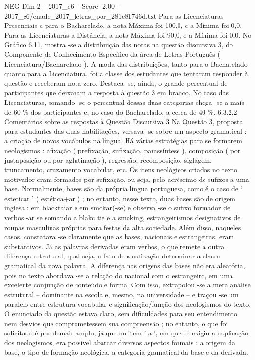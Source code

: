 \begin{textsample}{NEG Dim 2 – 2017\_c6 – Score -2.00 – 2017\_c6/enade\_2017\_letras\_por\_281c81746d.txt}
Para as Licenciaturas Presenciais e para o Bacharelado, a nota Máxima foi 100,0, e a Mínima foi 0,0.
Para as Licenciaturas a Distância, a nota Máxima foi 90,0, e a Mínima foi 0,0.
No Gráfico 6.11, mostra -se a distribuição das notas na questão discursiva 3, do Componente de Conhecimento Específico da área de Letras-Português ( Licenciatura/Bacharelado ).
A moda das distribuições, tanto para o Bacharelado quanto para a Licenciatura, foi a classe dos estudantes que tentaram responder à questão e receberam nota zero.
Destaca -se, ainda, o grande percentual de participantes que deixaram a resposta à questão 3 em branco.
No caso das Licenciaturas, somando -se o percentual dessas duas categorias chega -se a mais de 60 \% dos participantes e, no caso do Bacharelado, a cerca de 40 \%. 6.3.2.2 Comentários sobre as respostas à Questão Discursiva 3 Na Questão 3, proposta para estudantes das duas habilitações, versava -se sobre um aspecto gramatical : a criação de novos vocábulos na língua.
Há várias estratégias para se formarem neologismos : afixação ( prefixação, sufixação, parassíntese ), composição ( por justaposição ou por aglutinação ), regressão, recomposição, siglagem, truncamento, cruzamento vocabular, etc.
Os itens neológicos criados no texto motivador eram formados por sufixação, ou seja, pelo acréscimo de sufixos a uma base.
Normalmente, bases são da própria língua portuguesa, como é o caso de ‘ esteticar ’ ( estética+ar ) ; no entanto, nesse texto, duas bases são de origem inglesa : em blacktaiar e em smokar(-se) e observa -se o sufixo formador de verbos -ar se somando a blakc tie e a smoking, estrangeirismos designativos de roupas masculinas próprias para festas da alta sociedade.
Além disso, naqueles casos, constatava -se claramente que as bases, nacionais e estrangeiras, eram substantivos.
Já as palavras derivadas eram verbos, o que remete a outra diferença estrutural, qual seja, o fato de a sufixação determinar a classe gramatical da nova palavra.
A diferença nas origens das bases não era aleatória, pois no texto abordava -se a relação do nacional com o estrangeiro, em uma excelente conjunção de conteúdo e forma.
Com isso, extrapolou -se a mera análise estrutural – dominante na escola e, mesmo, na universidade – e traçou -se um paralelo entre estrutura vocabular e significação/função dos neologismos do texto.
O enunciado da questão estava claro, sem dificuldades para seu entendimento nem desvios que comprometessem sua compreensão ; no entanto, o que foi solicitado é por demais amplo, já que no item ' a ', em que se exigiu a explicação dos neologismos, era possível abarcar diversos aspectos formais : a origem da base, o tipo de formação neológica, a categoria gramatical da base e da derivada.

\end{textsample}
